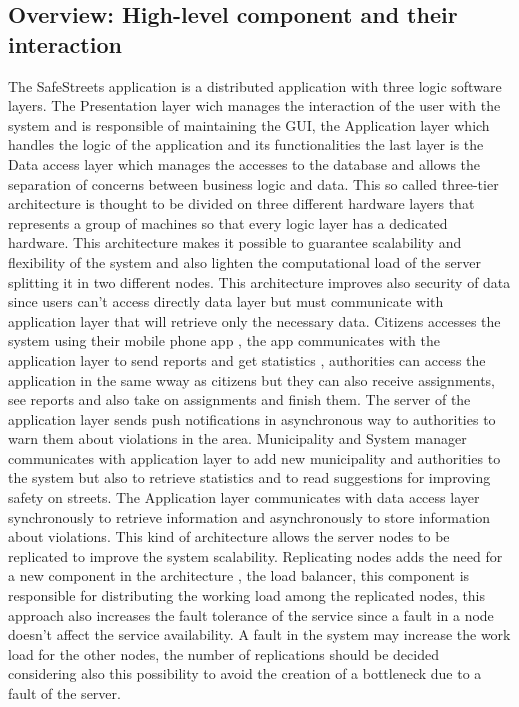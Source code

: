 \subsection{Overview: High-level component and their interaction}
The SafeStreets application is a distributed application with three logic software layers.
The Presentation layer wich manages the interaction of the user with the system and is responsible of maintaining the GUI, 
the Application layer which handles the logic of the application and its functionalities the last layer is the Data access layer which manages the accesses to the database and allows the separation of concerns between business logic and data.
This so called three-tier architecture is thought to be divided on three different hardware layers that represents a group of machines so that every logic layer has a dedicated hardware. This architecture makes it possible to guarantee scalability and flexibility of the system and also lighten the computational load of the server splitting it in two different nodes.
This architecture improves also security of data since users can't access directly data layer but must communicate with application layer that will retrieve only the necessary data.
Citizens accesses the system using their mobile phone app , the app communicates with the application layer to send reports and get statistics , authorities can access the application in the same wway as citizens but they can also receive assignments, see reports and also take on assignments and finish them.
The server of the application layer sends push notifications in asynchronous way to authorities to warn them about violations in the area.
Municipality and System manager communicates with application layer to add new municipality and authorities to the system but also to retrieve statistics and to read suggestions for improving safety on streets.
The Application layer communicates with data access layer synchronously to retrieve information and asynchronously to store information about violations.
This kind of architecture allows the server nodes to be replicated to improve the system scalability.
Replicating nodes adds the need for a new component in the architecture , the load balancer, this component is responsible for distributing the working load among the replicated nodes, this approach also increases the fault tolerance of the service since a fault in a node doesn't affect the service availability. A fault in the system may increase the work load for the other nodes, the number of replications should be decided considering also this possibility to avoid the creation of a bottleneck due to a fault of the server.
